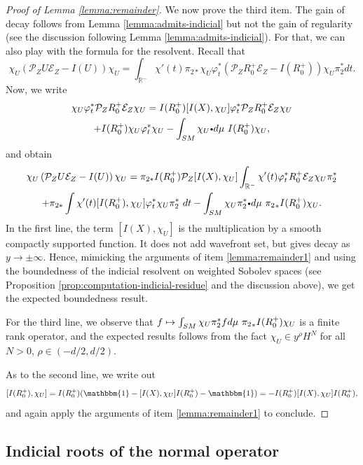 \documentclass[JEP,XML,SOM,Unicode,NoFloatCountersInSection]{cedram}
\newcommand\mto{\mathchoice{\longmapsto}{\mapsto}{\mapsto}{\mapsto}}
\newcommand{\sbullet}{{\scriptscriptstyle\bullet}}
\newcommand{\csbullet}{{\raisebox{1pt}{$\sbullet$}}}
\newcommand{\R}{\mathbb{R}}
\theoremstyle{plain}
\theoremstyle{definition}
\begin{document}
\begin{proof}[Proof of Lemma \ref{lemma:remainder}]
We now prove the third item. The gain of decay follows from Lemma \ref{lemma:admits-indicial} but not the gain of regularity (see the discussion following Lemma \ref{lemma:admits-indicial}). For that, we can also play with the formula for the resolvent. Recall that
\[
\chi_U\left(\mathcal{P}_Z U \mathcal{E}_Z - I(U)\right)\chi_U = \int_{\R^-} \chi'(t)\pi_{2\ast} \chi_U\varphi_t^* \left( \mathcal{P}_Z R_0^+ \mathcal{E}_Z - I(R_0^+)\right)\chi_U \pi_2^\ast dt.
\]
Now, we write
\begin{multline*}
\chi_U\varphi_t^* \mathcal{P}_Z R_0^+ \mathcal{E}_Z \chi_U = I(R_0^+) [I(X),\chi_U]\varphi_t^* \mathcal{P}_Z R_0^+ \mathcal{E}_Z \chi_U \\
+ I(R_0^+)\chi_U \varphi_t^* \chi_U - \int_{SM}\chi_U \csbullet d\mu~ I(R_0^+)\chi_U,
\end{multline*}
and obtain
\begin{multline*}
\chi_U\left(\mathcal{P}_Z U \mathcal{E}_Z - I(U)\right)\chi_U= \pi_{2\ast}I(R_0^+) \mathcal{P}_Z [I(X),\chi_U] \int_{\R^-}\chi'(t)\varphi_t^* R_0^+ \mathcal{E}_Z\chi_U \pi_2^\ast \\
+ \pi_{2\ast} \int \chi'(t) [I(R_0^+),\chi_U] \varphi_t^*\chi_U \pi_2^\ast \ dt - \int_{SM} \chi_U \pi_2^* \csbullet d\mu~ {\pi_2}_* I(R_0^+)\chi_U.
\end{multline*}
In the first line, the term $[I(X),\chi_U]$ is the multiplication by a smooth compactly supported function. It does not add wavefront set, but gives decay as $y\to\pm\infty$. Hence, mimicking the arguments of item \eqref{lemma:remainder1} and using the boundedness of the indicial resolvent on weighted Sobolev spaces (see Proposition \ref{prop:computation-indicial-residue} and the discussion above), we get the expected boundedness result.

{\color{black}For the third line, we observe that $f \mto \int_{SM} \chi_U \pi_2^* f d\mu~ {\pi_2}_* I(R_0^+)\chi_U$ is a finite rank operator, and the expected results follows from the fact $\chi_U\in y^\rho H^N$ for all $N>0$, $\rho\in (-d/2, d/2)$. }

As to the second line, we write out
\[
[I(R_0^+), \chi_U] = I(R_0^+)(\mathbbm{1} - [I(X),\chi_U]I(R_0^+) - \mathbbm{1}) =- I(R_0^+)[I(X),\chi_U]I(R_0^+),
\]
and again apply the arguments of item \eqref{lemma:remainder1} to conclude.
\end{proof}

\subsection{Indicial roots of the normal operator}
\label{ssection:roots}
\end{document}
